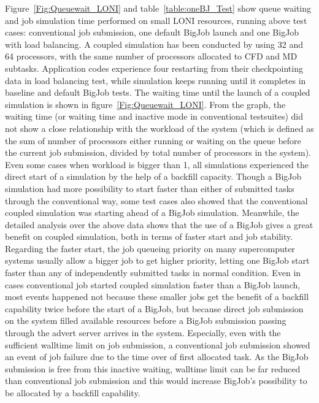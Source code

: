 \documentclass[conference,final]{IEEEtran}
\begin{document}
Figure~\ref{Fig:Queuewait_LONI} and table~\ref{table:oneBJ_Test} show queue waiting and job simulation time performed on small LONI resources, running above test cases: conventional job submission, one default BigJob launch and one BigJob with load balancing. A coupled simulation has been conducted by using 32 and 64 processors, with the same number of processors allocated to CFD and MD subtasks. Application codes experience four restarting from their checkpointing data in load balancing test, while simulation keeps running until it completes in baseline and default BigJob tests.
The waiting time until the launch of a coupled simulation is shown in figure~\ref{Fig:Queuewait_LONI}. From the graph, the waiting time (or waiting time and inactive mode in conventional testsuites) did not show a close relationship with the workload of the system (which is defined as the sum of number of processors either running or waiting on the queue before the current job submission, divided by total number of processors in the system). Even some cases when workload is bigger than 1, all simulations experienced the direct start of a simulation by the help of a backfill capacity. Though a BigJob simulation had more possibility to start faster than either of submitted tasks through the conventional way, some test cases also showed that the conventional coupled simulation was starting ahead of a BigJob simulation. 
Meanwhile, the detailed analysis over the above data shows that the use of a BigJob gives a great benefit on coupled simulation, both in terms of faster start and job stability. Regarding the faster start, the job queueing priority on many supercomputer systems usually allow a bigger job to get higher priority, letting one BigJob start faster than any of independently submitted tasks in normal condition. Even in cases conventional job started coupled simulation faster than a BigJob launch, most events happened not because these smaller jobs get the benefit of a backfill capability twice before the start of a BigJob, but because direct job submission on the system filled available resources before a BigJob submission passing through the advert server arrives in the system. Especially, even with the sufficient walltime limit on job submission, a conventional job submission showed an event of job failure due to the time over of first allocated task. As the BigJob submission is free from this inactive waiting, walltime limit can be far reduced than conventional job submission and this would increase BigJob's possibility to be allocated by a backfill capability.
\end{document}
